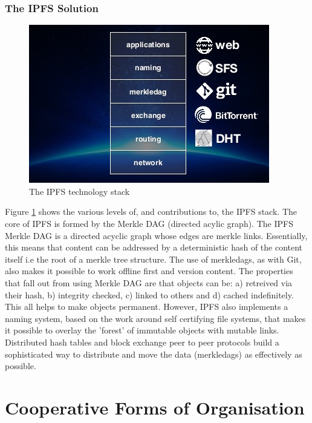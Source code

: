 \subsubsection{The IPFS Solution}
\begin{figure}
\centering
\includegraphics[width=\textwidth]{Figures/IpfsStack}
\decoRule
\caption[IPFS Stack]{The IPFS technology stack}
\label{fig:IpfsStack}
\end{figure}

Figure \ref{fig:IpfsStack} shows the various levels of, and contributions to, the IPFS stack. The core of IPFS is formed by the Merkle DAG (directed acylic graph). The IPFS Merkle DAG is a directed acyclic graph whose edges are merkle links. Essentially, this means that content can be addressed by a deterministic hash of the content itself i.e the root of a merkle tree structure. The use of merkledags, as with Git, also makes it possible to work offline first and version content. The properties that fall out from using Merkle DAG are that objects can be: a) retreived via their hash, b) integrity checked, c) linked to others and d) cached indefinitely. This all helps to make objects permanent. However, IPFS also implements a naming system, based on the work around self certifying file systems, that makes it possible to overlay the 'forest' of immutable objects with mutable links.\\ 

Distributed hash tables and block exchange peer to peer protocols build a sophisticated way to distribute and move the data (merkledags) as effectively as possible.

\section{Cooperative  Forms of Organisation}
